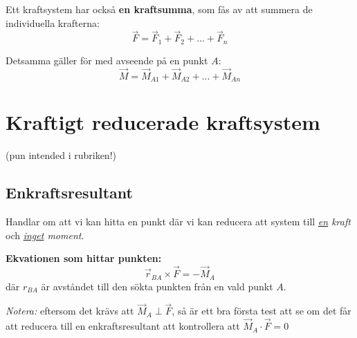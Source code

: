 \documentclass{article}
\newenvironment{ankiflashcard}[1][ ]{}{}
\begin{document}
\begin{paracol}{2}
\begin{ankiflashcard}
    
\end{ankiflashcard}

\begin{ankiflashcard}
    
Ett kraftsystem har också \textbf{en kraftsumma}, som fås av att summera de individuella krafterna:
$$
\vec F = \vec F_1+\vec F_2+...+\vec F_n
$$

\end{ankiflashcard}

\begin{ankiflashcard}
    
Detsamma gäller för  med avseende på en punkt $A$:
$$
\vec M = \vec M_{A1}+\vec M_{A2}+...+\vec M_{An}
$$
\end{ankiflashcard}

\section[title]{Kraftigt reducerade kraftsystem}
(pun intended i rubriken!)
\begin{ankiflashcard}
    
\subsection{Enkraftsresultant}
Handlar om att vi kan hitta en punkt där vi kan reducera att system till \textit{\underline{en} kraft} och \textit{\underline{inget} moment}.

\end{ankiflashcard}

\begin{ankiflashcard}
    
\textbf{Ekvationen som hittar punkten:}
$$
\vec r_{BA}\times \vec F = - \vec M_A
$$
där $r_{BA}$ är avståndet till den sökta punkten från en vald punkt $A$.


\textit{Notera:} eftersom det krävs att $\vec M_A \perp \vec F$, så är ett bra första test att se om det får att reducera till en enkraftsresultant att kontrollera att $\vec M_A \cdot \vec F = 0$

\end{ankiflashcard}

\begin{ankiflashcard}
    

\end{ankiflashcard}
\end{paracol}
\end{document}
